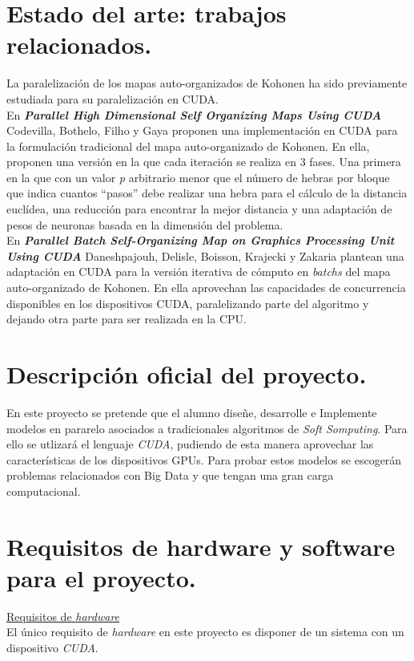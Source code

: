 \documentclass[a4paper,oneside,11pt,titlepage]{book}
\begin{document}
\section{Estado del arte: trabajos relacionados.}
La paralelización de los mapas auto-organizados de Kohonen ha sido previamente estudiada para su paralelización en CUDA.\\

En \textbf{\textit{Parallel High Dimensional Self Organizing Maps Using CUDA}}  Codevilla, Bothelo, Filho y Gaya \cite{cudasomonline} proponen una implementación en CUDA para la formulación tradicional del mapa auto-organizado de Kohonen. En ella, proponen una versión en la que cada iteración se realiza en 3 fases. Una primera en la que con un valor \textit{p} arbitrario menor que el número de hebras por bloque que indica cuantos ``pasos'' debe realizar una hebra para el cálculo de la distancia euclídea, una reducción para encontrar la mejor distancia y una adaptación de pesos de neuronas basada en la dimensión del problema. \\

En \textbf{\textit{Parallel Batch Self-Organizing Map on Graphics Processing Unit Using CUDA}}  Daneshpajouh, Delisle, Boisson, Krajecki y Zakaria \cite{cudasombatch} plantean una adaptación en CUDA para la versión iterativa de cómputo en \textit{batchs} del mapa auto-organizado de Kohonen. En ella aprovechan las capacidades de concurrencia disponibles en los dispositivos CUDA, paralelizando parte del algoritmo y dejando otra parte  para ser realizada en la CPU.

\section{Descripción oficial del proyecto.}
En este proyecto se pretende que el alumno diseñe, desarrolle e Implemente modelos en pararelo asociados a tradicionales algoritmos de \textit{Soft Somputing}. Para ello se utlizará el lenguaje \textit{CUDA}, pudiendo de esta manera aprovechar las características de los dispositivos GPUs. Para probar estos modelos se escogerán problemas relacionados con Big Data y que tengan una gran carga computacional.

\section{Requisitos de hardware y software para el proyecto.}
\underline{Requisitos de \textit{hardware}}\\
El único requisito de \textit{hardware} en este proyecto es disponer de un sistema con un dispositivo \textit{CUDA}. \\
\end{document}
